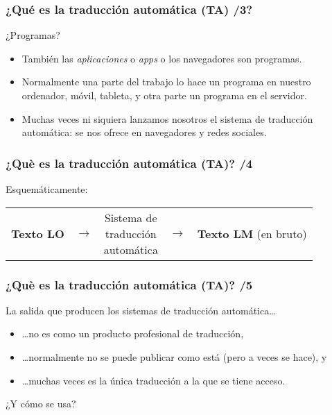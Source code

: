 \documentclass{beamer}
\begin{document}
\begin{frame}
  
\frametitle{¿Qué es la traducción automática (TA) /3?}

¿Programas?
\begin{itemize}
\item También las \emph{aplicaciones} o \emph{apps} o los navegadores
  son programas.
\item Normalmente una parte del trabajo lo hace un programa en nuestro
  ordenador, móvil, tableta, y otra parte un programa en el servidor.
\item Muchas veces ni siquiera lanzamos nosotros el sistema de traducción automática: se nos ofrece en navegadores y redes sociales.
\end{itemize}
\end{frame}



\begin{frame}
\frametitle{¿Què es la traducción automática (TA)? /4}

Esquemáticamente:

\begin{center}
\begin{tabular}{ccccc}
\textbf{Texto LO} & $\to$ & \framebox{\parbox{2.2cm}{Sistema de \\ traducción
    \\ automática}} & $\to$ & \parbox{2.0cm}{\textbf{Texto LM} (en bruto)} \\ 
\end{tabular}
\end{center}


\end{frame}


\begin{frame}
\frametitle{¿Què es la traducción automática (TA)? /5}

La salida que producen los sistemas de traducción automática\ldots
\begin{itemize}
\item \ldots no es como un producto profesional de traducción,
\item \ldots normalmente no se puede publicar como está (pero a veces se hace), y
\item \ldots muchas veces es la única traducción a la que se tiene acceso.
\end{itemize}
¿Y cómo se usa?

\end{frame}
\end{document}
